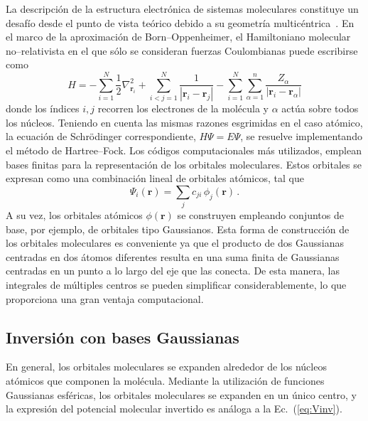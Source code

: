 La descripción de la estructura electrónica de sistemas moleculares 
constituye un desafío desde el punto de vista teórico debido a su 
geometría multicéntrica~\cite{Helgaker:00,Schaefer:04}. 
En el marco de la aproximación de Born--Oppenheimer, el Hamiltoniano 
molecular no--relativista en el que sólo se consideran fuerzas 
Coulombianas puede escribirse como
\begin{equation}
H=-\sum_{i=1}^N \frac{1}{2} \nabla^2_{\mathbf{r}_i} 
  +\sum_{i<j=1}^N \frac{1}{\left|\mathbf{r}_i-\mathbf{r}_j\right|} 
  -\sum_{i=1}^N \sum_{\alpha=1}^n \frac{Z_{\alpha}}{
    \left|\mathbf{r}_i-\mathbf{r}_{\alpha}\right|} 
\label{eq:BOhamiltonian}
\end{equation}
donde los índices $i,j$ recorren los electrones de la molécula y 
$\alpha$ actúa sobre todos los núcleos. 
Teniendo en cuenta las mismas razones esgrimidas en el caso atómico, la 
ecuación de Schr\"odinger correspondiente, $H\Psi=E\Psi$, se resuelve 
implementando el método de Hartree--Fock. Los códigos computacionales 
más utilizados, emplean bases finitas para la representación de los 
orbitales moleculares. Estos orbitales se expresan como una combinación 
lineal de orbitales atómicos, 
tal que
\begin{equation}
\Psi_i(\mathbf{r})=\sum_j c_{ji} \, \phi_j(\mathbf{r})\,.
\end{equation}
A su vez, los orbitales atómicos $\phi(\mathbf{r})$ se construyen 
empleando conjuntos de base, por ejemplo, de orbitales tipo Gaussianos. 
Esta forma de construcción de los orbitales moleculares es conveniente 
ya que el producto de dos Gaussianas centradas en dos átomos diferentes 
resulta en una suma finita de Gaussianas centradas en un punto a lo 
largo del eje que las conecta. De esta manera, las integrales de 
múltiples centros se pueden simplificar considerablemente, lo que 
proporciona una gran ventaja computacional.

\subsection{Inversión con bases Gaussianas}
\label{sec:invmol}

En general, los orbitales moleculares se expanden alrededor de los 
núcleos atómicos que componen la molécula. Mediante la utilización de 
funciones Gaussianas esféricas, los orbitales moleculares se expanden en 
un único centro, y la expresión del potencial molecular invertido es 
análoga a la Ec.~(\ref{eq:Vinv}). 

